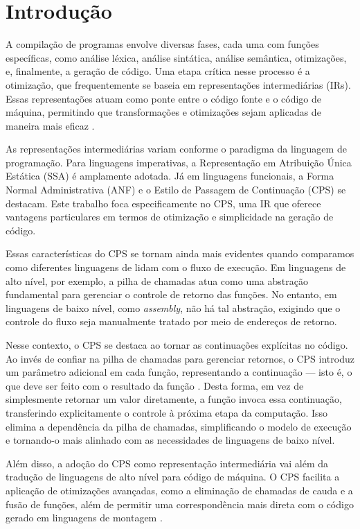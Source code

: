 \chapter{Introdução}\label{sec:introducao}

A compilação de programas envolve diversas fases, cada uma com funções específicas, como análise léxica, análise sintática, análise semântica, otimizações, e, finalmente, a geração de código.
Uma etapa crítica nesse processo é a otimização, que frequentemente se baseia em representações intermediárias (IRs).
Essas representações atuam como ponte entre o código fonte e o código de máquina, permitindo que transformações e otimizações sejam aplicadas de maneira mais eficaz \cite{PLOTKIN1975125}.

As representações intermediárias variam conforme o paradigma da linguagem de programação.
Para linguagens imperativas, a Representação em Atribuição Única Estática (SSA) é amplamente adotada.
Já em linguagens funcionais, a Forma Normal Administrativa (ANF) e o Estilo de Passagem de Continuação (CPS) se destacam.
Este trabalho foca especificamente no CPS, uma IR que oferece vantagens particulares em termos de otimização e simplicidade na geração de código.

Essas características do CPS se tornam ainda mais evidentes quando comparamos como diferentes linguagens de lidam com o fluxo de execução. Em linguagens de alto nível, por exemplo, a pilha de chamadas atua como uma abstração fundamental para gerenciar o controle de retorno das funções. No entanto, em linguagens de baixo nível, como \textit{assembly}, não há tal abstração, exigindo que o controle do fluxo seja manualmente tratado por meio de endereços de retorno.

Nesse contexto, o CPS se destaca ao tornar as continuações explícitas no código.
Ao invés de confiar na pilha de chamadas para gerenciar retornos, o CPS introduz um parâmetro adicional em cada função, representando a continuação — isto é, o que deve ser feito com o resultado da função \cite{KENNEDY2007}.
Desta forma, em vez de simplesmente retornar um valor diretamente, a função invoca essa continuação, transferindo explicitamente o controle à próxima etapa da computação.
Isso elimina a dependência da pilha de chamadas, simplificando o modelo de execução e tornando-o mais alinhado com as necessidades de linguagens de baixo nível.

Além disso, a adoção do CPS como representação intermediária vai além da tradução de linguagens de alto nível para código de máquina.
O CPS facilita a aplicação de otimizações avançadas, como a eliminação de chamadas de cauda e a fusão de funções, além de permitir uma correspondência mais direta com o código gerado em linguagens de montagem \cite{FLANAGAN1993}.

